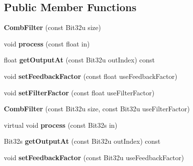 \subsection*{Public Member Functions}
\begin{DoxyCompactItemize}
\item 
\hypertarget{classMT32Emu_1_1CombFilter_a8e99fc647edc80fa6e9549db5e4fef1a}{{\bfseries Comb\-Filter} (const Bit32u size)}\label{classMT32Emu_1_1CombFilter_a8e99fc647edc80fa6e9549db5e4fef1a}

\item 
\hypertarget{classMT32Emu_1_1CombFilter_ace1d8df3fbf3f05e9cabbe32df7b1624}{void {\bfseries process} (const float in)}\label{classMT32Emu_1_1CombFilter_ace1d8df3fbf3f05e9cabbe32df7b1624}

\item 
\hypertarget{classMT32Emu_1_1CombFilter_a10ac24b24fc8228a4fc17e179299163f}{float {\bfseries get\-Output\-At} (const Bit32u out\-Index) const }\label{classMT32Emu_1_1CombFilter_a10ac24b24fc8228a4fc17e179299163f}

\item 
\hypertarget{classMT32Emu_1_1CombFilter_a1ca73514aa1a08ed52eae63c649a8848}{void {\bfseries set\-Feedback\-Factor} (const float use\-Feedback\-Factor)}\label{classMT32Emu_1_1CombFilter_a1ca73514aa1a08ed52eae63c649a8848}

\item 
\hypertarget{classMT32Emu_1_1CombFilter_aa167b306c4bfd7ae466bdfbffa2264a8}{void {\bfseries set\-Filter\-Factor} (const float use\-Filter\-Factor)}\label{classMT32Emu_1_1CombFilter_aa167b306c4bfd7ae466bdfbffa2264a8}

\item 
\hypertarget{classMT32Emu_1_1CombFilter_ab2f7553491cb2cca17daabe177544ae9}{{\bfseries Comb\-Filter} (const Bit32u size, const Bit32u use\-Filter\-Factor)}\label{classMT32Emu_1_1CombFilter_ab2f7553491cb2cca17daabe177544ae9}

\item 
\hypertarget{classMT32Emu_1_1CombFilter_ae1d1575e81a4585e6fc27f895fc2f8c4}{virtual void {\bfseries process} (const Bit32s in)}\label{classMT32Emu_1_1CombFilter_ae1d1575e81a4585e6fc27f895fc2f8c4}

\item 
\hypertarget{classMT32Emu_1_1CombFilter_ad33d09330d93a8daaa59be3c909e31a1}{Bit32s {\bfseries get\-Output\-At} (const Bit32u out\-Index) const }\label{classMT32Emu_1_1CombFilter_ad33d09330d93a8daaa59be3c909e31a1}

\item 
\hypertarget{classMT32Emu_1_1CombFilter_a7a5cd3f69e41e8ce0a06fe592102fbf3}{void {\bfseries set\-Feedback\-Factor} (const Bit32u use\-Feedback\-Factor)}\label{classMT32Emu_1_1CombFilter_a7a5cd3f69e41e8ce0a06fe592102fbf3}

\end{DoxyCompactItemize}
